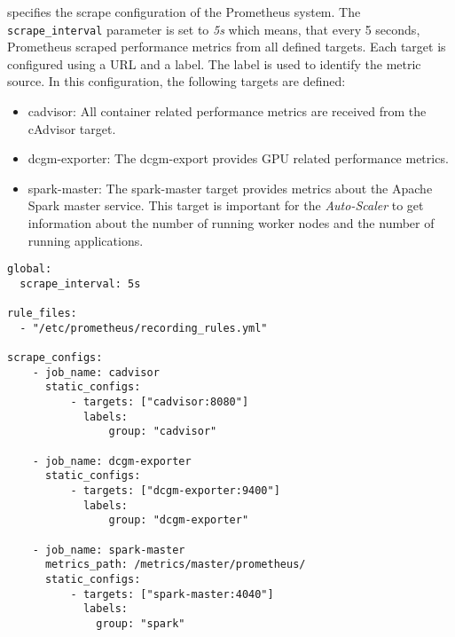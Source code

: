  specifies the scrape configuration of the Prometheus system.
The \texttt{scrape\_interval} parameter is set to \textit{5s} which means, that every 5 seconds, Prometheus scraped performance metrics from all defined targets.
Each target is configured using a URL and a label. The label is used to identify the metric source.
In this configuration, the following targets are defined:
\begin{itemize}
\item cadvisor: All container related performance metrics are received from the cAdvisor target.

\item dcgm-exporter: The dcgm-export provides GPU related performance metrics.

\item spark-master: The spark-master target provides metrics about the Apache Spark master service. This target is important for the \textit{Auto-Scaler} to get information about the number of running worker nodes and the number of running applications.
\end{itemize}
\begin{lstlisting}[label=lst:06_computing_am_prom-config, caption=Prometheus target configuration in YAML syntax]
global:
  scrape_interval: 5s
 
rule_files:
  - "/etc/prometheus/recording_rules.yml"
 
scrape_configs:
    - job_name: cadvisor
      static_configs:
          - targets: ["cadvisor:8080"]
            labels:
                group: "cadvisor"
 
    - job_name: dcgm-exporter
      static_configs:
          - targets: ["dcgm-exporter:9400"]
            labels:
                group: "dcgm-exporter"
    
    - job_name: spark-master
      metrics_path: /metrics/master/prometheus/
      static_configs:
          - targets: ["spark-master:4040"]
            labels:
              group: "spark"
\end{lstlisting}


